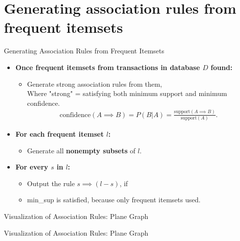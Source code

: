 \section{Generating association rules from frequent itemsets}

\begin{frame}{Generating Association Rules from Frequent Itemsets}
	\begin{itemize}
		\item \textbf{Once frequent itemsets from transactions in
			      database $D$ found:}
		      \begin{itemize}
			      \item Generate strong association rules from them,\\
			            Where "strong" = satisfying both minimum support and
			            minimum confidence.
			            \begin{align*}
				            \text{confidence}(A \implies B) = P(B|A) = \frac{\text{support}(A \implies B)}{\text{support}(A)}.
			            \end{align*}
		      \end{itemize}
		\item \textbf{For each frequent itemset $l$:}
		      \begin{itemize}
			      \item Generate all \textbf{nonempty subsets} of $l$.
		      \end{itemize}
		\item \textbf{For every $s$ in $l$:}
		      \begin{itemize}
			      \item Output the rule $s \implies (l - s)$, if
			      \item min\_sup is satisfied, because only frequent itemsets
			            used.
		      \end{itemize}
	\end{itemize}
\end{frame}

\begin{frame}{Visualization of Association Rules: Plane Graph}
	\centering
\end{frame}

\begin{frame}{Visualization of Association Rules: Plane Graph}
	\centering
\end{frame}
